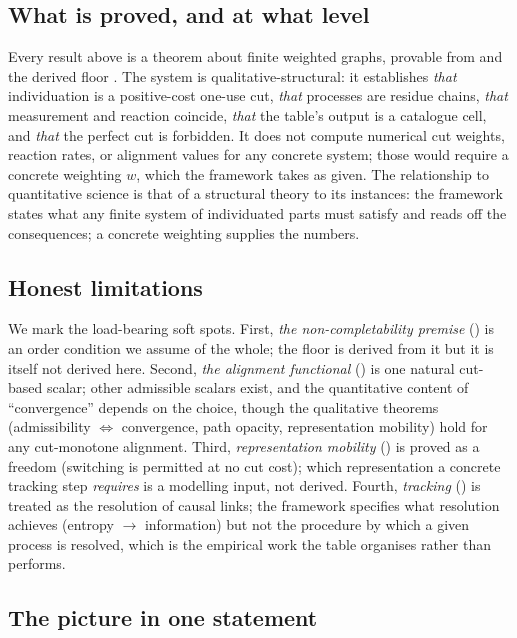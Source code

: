\documentclass[11pt,a4paper]{article}
\theoremstyle{thmstyle}
\theoremstyle{definition}
\theoremstyle{remark}
\newcommand{\wt}{w}
\begin{document}
\subsection{What is proved, and at what level}

Every result above is a theorem about finite weighted graphs, provable from
 and the derived floor . The system is
qualitative-structural: it establishes \emph{that} individuation is a
positive-cost one-use cut, \emph{that} processes are residue chains,
\emph{that} measurement and reaction coincide, \emph{that} the table's
output is a catalogue cell, and \emph{that} the perfect cut is forbidden.
It does not compute numerical cut weights, reaction rates, or alignment
values for any concrete system; those would require a concrete weighting
$\wt$, which the framework takes as given. The relationship to quantitative
science is that of a structural theory to its instances: the framework
states what any finite system of individuated parts must satisfy and reads
off the consequences; a concrete weighting supplies the numbers.

\subsection{Honest limitations}

We mark the load-bearing soft spots. First, \emph{the non-completability
premise} () is an order condition we assume of the
whole; the floor is derived from it but it is itself not derived here.
Second, \emph{the alignment functional} () is one
natural cut-based scalar; other admissible scalars exist, and the
quantitative content of ``convergence'' depends on the choice, though the
qualitative theorems (admissibility $\iff$ convergence, path opacity,
representation mobility) hold for any cut-monotone alignment. Third,
\emph{representation mobility} () is proved as a
freedom (switching is permitted at no cut cost); which representation a
concrete tracking step \emph{requires} is a modelling input, not derived.
Fourth, \emph{tracking} () is treated as the
resolution of causal links; the framework specifies what resolution
achieves (entropy $\to$ information) but not the procedure by which a given
process is resolved, which is the empirical work the table organises rather
than performs.

\subsection{The picture in one statement}
\end{document}
